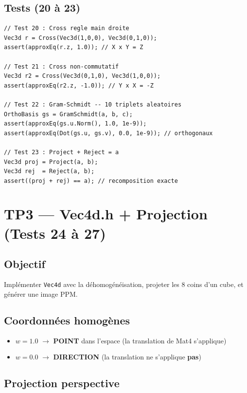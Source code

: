 \documentclass[12pt,a4paper]{report}
\begin{document}
\subsection{Tests (20 à 23)}

\begin{lstlisting}[caption={Tests Vec3d}]
// Test 20 : Cross regle main droite
Vec3d r = Cross(Vec3d(1,0,0), Vec3d(0,1,0));
assert(approxEq(r.z, 1.0)); // X x Y = Z

// Test 21 : Cross non-commutatif
Vec3d r2 = Cross(Vec3d(0,1,0), Vec3d(1,0,0));
assert(approxEq(r2.z, -1.0)); // Y x X = -Z

// Test 22 : Gram-Schmidt -- 10 triplets aleatoires
OrthoBasis gs = GramSchmidt(a, b, c);
assert(approxEq(gs.u.Norm(), 1.0, 1e-9));
assert(approxEq(Dot(gs.u, gs.v), 0.0, 1e-9)); // orthogonaux

// Test 23 : Project + Reject = a
Vec3d proj = Project(a, b);
Vec3d rej  = Reject(a, b);
assert((proj + rej) == a); // recomposition exacte
\end{lstlisting}

\section{TP3 --- Vec4d.h + Projection (Tests 24 à 27)}

\subsection{Objectif}

Implémenter \texttt{Vec4d} avec la déhomogénéisation, projeter les
8 coins d'un cube, et générer une image PPM.

\subsection{Coordonnées homogènes}

\begin{itemize}
    \item $w = 1.0$ $\rightarrow$ \textbf{POINT} dans l'espace
          (la translation de Mat4 s'applique)
    \item $w = 0.0$ $\rightarrow$ \textbf{DIRECTION}
          (la translation ne s'applique \textbf{pas})
\end{itemize}

\subsection{Projection perspective}
\end{document}
